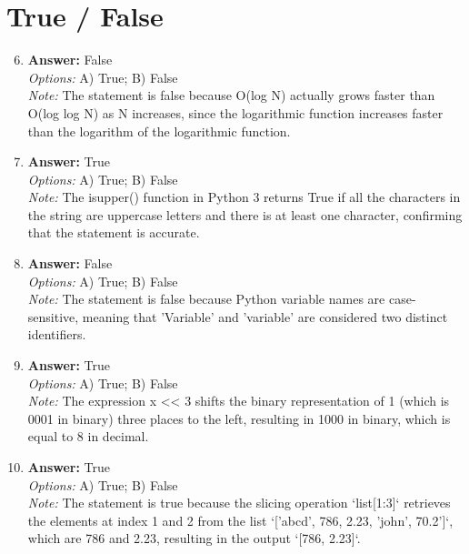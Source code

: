 \documentclass[12pt]{article}
\begin{document}
\section*{True / False}
\begin{enumerate}[label=\arabic*.]
\setcounter{enumi}{5}
\item \textbf{Answer:} False
\\ \textit{Options:} A) True; B) False
\\ \textit{Note:} The statement is false because O(log N) actually grows faster than O(log log N) as N increases, since the logarithmic function increases faster than the logarithm of the logarithmic function.
\item \textbf{Answer:} True
\\ \textit{Options:} A) True; B) False
\\ \textit{Note:} The isupper() function in Python 3 returns True if all the characters in the string are uppercase letters and there is at least one character, confirming that the statement is accurate.
\item \textbf{Answer:} False
\\ \textit{Options:} A) True; B) False
\\ \textit{Note:} The statement is false because Python variable names are case-sensitive, meaning that 'Variable' and 'variable' are considered two distinct identifiers.
\item \textbf{Answer:} True
\\ \textit{Options:} A) True; B) False
\\ \textit{Note:} The expression x \textless{}\textless{} 3 shifts the binary representation of 1 (which is 0001 in binary) three places to the left, resulting in 1000 in binary, which is equal to 8 in decimal.
\item \textbf{Answer:} True
\\ \textit{Options:} A) True; B) False
\\ \textit{Note:} The statement is true because the slicing operation `list[1:3]` retrieves the elements at index 1 and 2 from the list `['abcd', 786, 2.23, 'john', 70.2']`, which are 786 and 2.23, resulting in the output `[786, 2.23]`.
\end{enumerate}
\end{document}
